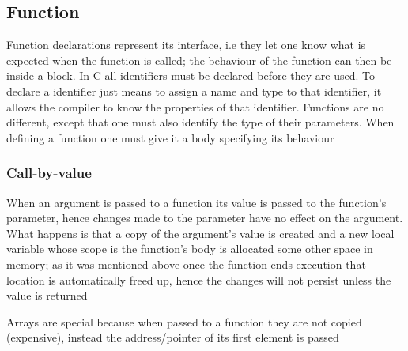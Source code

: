 \subsection{Function}
\par{Function declarations represent its interface, i.e they let one know what is expected when
the function is called; the behaviour of the function can then be  inside a block. In C
all identifiers must be declared before they are used. To declare a identifier just means to
assign a name and type to that identifier, it allows the compiler to know the properties of that
identifier. Functions are no different, except that one must also identify the type of their
parameters. When defining a function one must give it a body specifying its behaviour}    


\subsubsection{Call-by-value}
\par{When an argument is passed to a function its value is passed to the function's parameter,
hence changes made to the parameter have no effect on the argument. What happens is that a copy of
the argument's value is created and a new local variable whose scope is the function's body is
allocated some other space in memory; as it was mentioned above once the function ends execution
that location is automatically freed up, hence the changes will not persist unless the value is
returned}
\par{Arrays are special because when passed to a function they are not copied (expensive),
instead the address/pointer of its first element is passed}
